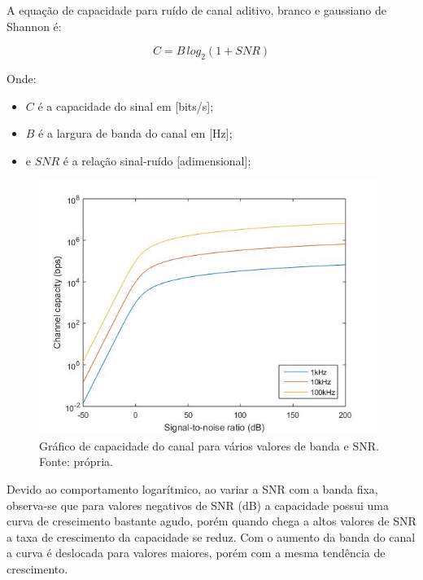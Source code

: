 A equação de capacidade para ruído de canal aditivo, branco e gaussiano de Shannon é:

\begin{equation}
    C = B \, log_2\left(1+ SNR\right)
\end{equation}

Onde:
\begin{itemize}
    \item $C$ é a capacidade do sinal em [bits/s];
    \item $B$ é a largura de banda do canal em [Hz];
    \item e $SNR$ é a relação sinal-ruído [adimensional];
\end{itemize}

\begin{figure}[H]
\begin{center}
\includegraphics[width=11cm]{untitled.jpg}
\caption{Gráfico de capacidade do canal para vários valores de banda e SNR. Fonte: própria.}
\label{fig:1} 
\end{center}
\end{figure}

Devido ao comportamento logarítmico, ao variar a SNR com a banda fixa, observa-se que para valores negativos de SNR (dB) a capacidade possui uma curva de crescimento bastante agudo, porém quando chega a altos valores de SNR a taxa de crescimento da capacidade se reduz. Com o aumento da banda do canal a curva é deslocada para valores maiores, porém com a mesma tendência de crescimento.